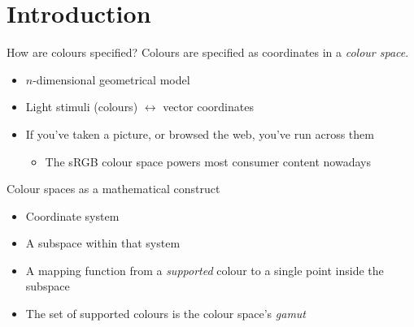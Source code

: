 \documentclass[aspectratio=169,usepdftitle=false]{fireshonks}
\begin{document}
\section{Introduction}
\begin{frame}{How are colours specified?}
    Colours are specified as coordinates in a \emph{colour space}.
    \begin{itemize}[<+(1)->]
        \item $n$-dimensional geometrical model
        \item Light stimuli (colours) $\leftrightarrow$ vector coordinates
        \item If you've taken a picture, or browsed the web, you've run across them
              \begin{itemize}
                  \item The sRGB colour space powers most consumer content nowadays
              \end{itemize}
    \end{itemize}
\end{frame}
\begin{frame}{Colour spaces as a mathematical construct}
    \begin{itemize}
        \item Coordinate system
        \item A subspace within that system
        \item A mapping function from a \emph{supported} colour to a single point inside the subspace
        \item The set of supported colours is the colour space's \emph{gamut}
    \end{itemize}
\end{frame}
\end{document}
